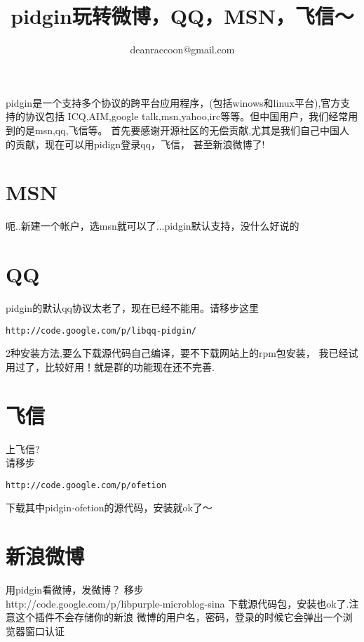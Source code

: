 \documentclass[adobefonts]{ctexart}
\title{\textbf{pidgin玩转微博，QQ，MSN，飞信～}}
\author{deanraccoon@gmail.com}
\begin{document}
\maketitle
\tableofcontents
\newpage

pidgin是一个支持多个协议的跨平台应用程序，(包括winows和linux平台),官方支持的协议包括
ICQ,AIM,google talk,msn,yahoo,irc等等。但中国用户，我们经常用到的是msn,qq,飞信等。
首先要感谢开源社区的无偿贡献,尤其是我们自己中国人的贡献，现在可以用pidign登录qq，飞信，
甚至新浪微博了!

\section{MSN}
呃..新建一个帐户，选msn就可以了...pidgin默认支持，没什么好说的

\section{QQ}
pidgin的默认qq协议太老了，现在已经不能用。请移步这里
\begin{verbatim}
http://code.google.com/p/libqq-pidgin/
\end{verbatim}

2种安装方法,要么下载源代码自己编译，要不下载网站上的rpm包安装，
我已经试用过了，比较好用！就是群的功能现在还不完善.

\section{飞信}
上飞信?\\
请移步
\begin{verbatim}
http://code.google.com/p/ofetion
\end{verbatim}

下载其中pidgin-ofetion的源代码，安装就ok了～

\section{新浪微博}
用pidgin看微博，发微博？
移步\\
http://code.google.com/p/libpurple-microblog-sina
下载源代码包，安装也ok了.注意这个插件不会存储你的新浪
微博的用户名，密码，登录的时候它会弹出一个浏览器窗口认证



\end{document}
